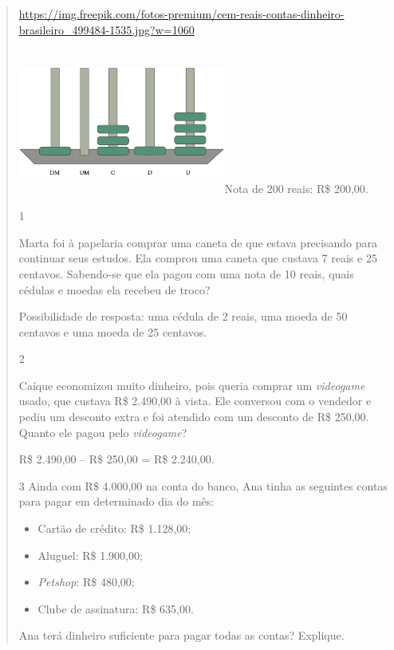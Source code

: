 \begin{mdframed}[linewidth=2pt,linecolor=salmao,roundcorner=2pt]
\begin{itemize}
{\begin{itemize}
\begin{escolha}
{\begin{quote}
{\url{https://img.freepik.com/fotos-premium/cem-reais-contas-dinheiro-brasileiro_499484-1535.jpg?w=1060}

\includegraphics[width=2.68333in,height=1.88913in]{media/image80.png}Nota
de 200 reais: R\$ 200,00.


\num{1}

Marta foi à papelaria comprar uma caneta de que estava precisando para
continuar seus estudos. Ela comprou uma caneta que custava 7 reais e 25
centavos. Sabendo-se que ela pagou com uma nota de 10 reais, quais
cédulas e moedas ela recebeu de troco?

Possibilidade de resposta: uma cédula de 2 reais, uma moeda de 50 centavos e uma moeda de 25 centavos.

\num{2}

Caíque economizou muito dinheiro, pois queria comprar um \textit{videogame} usado,
que custava R\$ 2.490,00 à vista. Ele conversou com o vendedor e pediu
um desconto extra e foi atendido com um desconto de R\$ 250,00. Quanto
ele pagou pelo \textit{videogame}?

R\$ 2.490,00 -- R\$ 250,00 = R\$ 2.240,00.

\num{3} Ainda com R\$ 4.000,00 na conta do banco, Ana tinha as seguintes contas para pagar em determinado dia do mês:

\begin{itemize}
  \item Cartão de crédito: R\$ 1.128,00;
  \item Aluguel: R\$ 1.900,00;
  \item \textit{Petshop}: R\$ 480,00;
  \item Clube de assinatura: R\$ 635,00.
\end{itemize}

Ana terá dinheiro suficiente para pagar todas as contas? Explique.



}
\end{quote}}
\end{escolha}
\end{itemize}}
\end{itemize}
\end{mdframed}
